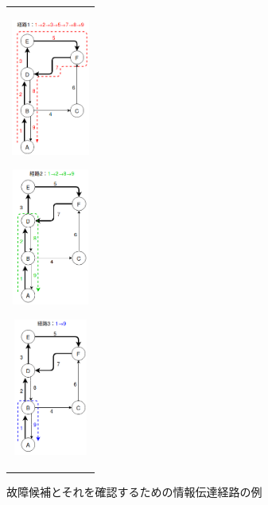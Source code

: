 \documentclass[11pt]{jsarticle}%
\begin{document}
\begin{multicols}{2}
  \begin{figure}[H]
    \centering
       \begin{tabular}{c}
          \begin{minipage}{0.30\hsize}
          \centering
          \includegraphics[height=4.5cm]{../figure/route1.png}
             \label{fig:route1}
          \end{minipage}
          \begin{minipage}{0.30\hsize}
          \centering
          \includegraphics[height=4.5cm]{../figure/route2.png}
             \label{fig:route2}
          \end{minipage}
          \begin{minipage}{0.30\hsize}
             \centering
             \includegraphics[height=4.5cm]{../figure/route3.png}
                \label{fig:route2}
             \end{minipage}
       \end{tabular} 
       \caption{故障候補とそれを確認するための情報伝達経路の例}%

\end{figure}
\end{multicols}
\end{document}
